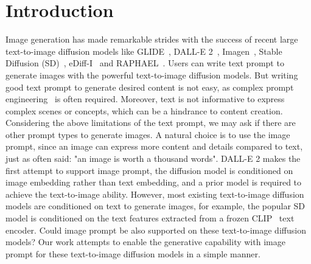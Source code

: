 \documentclass{article}
\begin{document}
\section{Introduction}
Image generation has made remarkable strides with the success of recent large text-to-image diffusion models like GLIDE~\cite{nichol2021glide}, DALL-E 2~\cite{ramesh2022hierarchical}, Imagen~\cite{saharia2022photorealistic}, Stable Diffusion (SD)~\cite{rombach2022high}, eDiff-I~\cite{balaji2022ediffi} and RAPHAEL~\cite{xue2023raphael}. Users can write text prompt to generate images with the powerful text-to-image diffusion models. But writing good text prompt to generate desired content is not easy, as complex prompt engineering~\cite{witteveen2022investigating} is often required. Moreover, text is not informative to express complex scenes or concepts, which can be a hindrance to content creation. Considering the above limitations of the text prompt, we may ask if there are other prompt types to generate images. A natural choice is to use the image prompt, since an image can express more content and details compared to text, just as often said: "an image is worth a thousand words". DALL-E 2\cite{ramesh2022hierarchical} makes the first attempt to support image prompt, the diffusion model is conditioned on image embedding rather than text embedding, and a prior model is required to achieve the text-to-image ability. However, most existing text-to-image diffusion models are conditioned on text to generate images, for example, the popular SD model is conditioned on the text features extracted from a frozen CLIP~\cite{radford2021learning} text encoder. Could image prompt be also supported on these text-to-image diffusion models? Our work attempts to enable the generative capability with image prompt for these text-to-image diffusion models in a simple manner.
\end{document}
